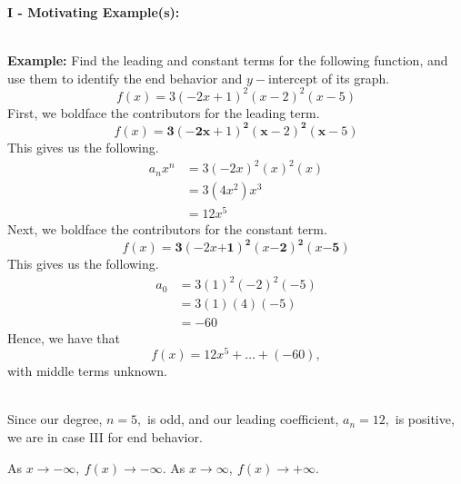 \documentclass[12pt]{article}
\theoremstyle{definition}
\begin{document}
{\begin{minipage}{1\linewidth}
\begin{center}
\begin{multicols}{2}
\end{multicols}
\end{center}
\end{minipage}
}
\pagebreak

{\bf I - Motivating Example(s):}\\
\ \par
{\bf Example:} Find the leading and constant terms for the following function, and use them to identify the end behavior and $y-$intercept of its graph.
$$f(x)=3(-2x+1)^2(x-2)^2(x-5)$$
First, we boldface the contributors for the leading term.
$$f(x)=\mathbf{3}(\mathbf{-2x}+1)^{\mathbf{2}}(\mathbf{x}-2)^{\mathbf{2}}(\mathbf{x}-5)$$
This gives us the following.
\begin{equation*}
\begin{split}
a_nx^n & =3(-2x)^{2}(x)^{2}(x)\\
& = 3(4x^2)x^3\\
& = 12x^5
\end{split}
\end{equation*}
Next, we boldface the contributors for the constant term.
$$f(x)=\mathbf{3}(-2x\mathbf{+1})^{\mathbf{2}}(x\mathbf{-2})^{\mathbf{2}}(x\mathbf{-5})$$
This gives us the following.
\begin{equation*}
\begin{split}
a_0 & = 3(1)^{2}(-2)^{2}(-5)\\
& = 3(1)(4)(-5)\\
& = -60
\end{split}
\end{equation*}
Hence, we have that
$$f(x)=12x^5+\ldots +(-60),$$
with middle terms unknown.\\
\ \par
Since our degree, $n=5,$ is odd, and our leading coefficient, $a_n=12,$ is positive, we are in case III for end behavior.
\begin{center}
As $x\rightarrow -\infty, \ f(x)\rightarrow -\infty.$ \hspace{1in} As $x\rightarrow \infty, \ f(x)\rightarrow +\infty.$
\end{center}
\end{document}
